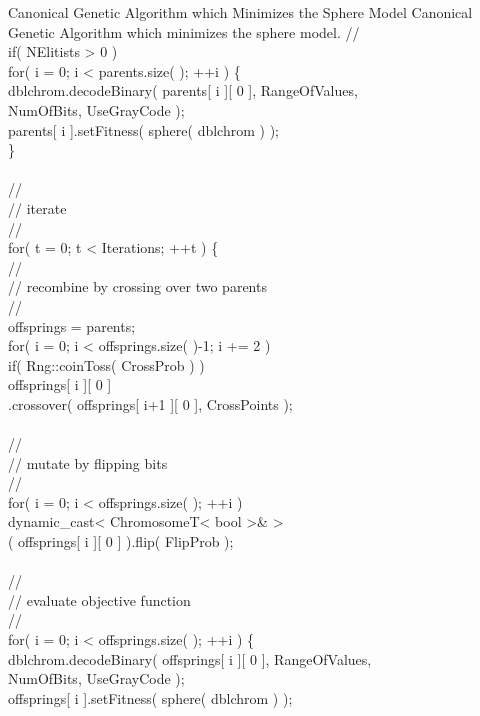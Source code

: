 \begin{programlisting}{Canonical Genetic Algorithm which Minimizes the Sphere Model}{
    Canonical Genetic Algorithm which minimizes the sphere model.}
    //\\
    if( NElitists > 0 )\\
        for( i = 0; i < parents.size( ); ++i ) \{\\
            dblchrom.decodeBinary( parents[ i ][ 0 ], RangeOfValues,\\
                                   NumOfBits, UseGrayCode );\\
            parents[ i ].setFitness( sphere( dblchrom ) );\\
        \}\\
\\
    //\\
    // iterate\\
    //\\
    for( t = 0; t < Iterations; ++t ) \{\\
        //\\
        // recombine by crossing over two parents\\
        //\\
        offsprings = parents;\\
        for( i = 0; i < offsprings.size( )-1; i += 2 )\\
            if( Rng::coinToss( CrossProb ) )\\
                offsprings[ i ][ 0 ]\\
                  .crossover( offsprings[ i+1 ][ 0 ], CrossPoints );\\
\\
        //\\
        // mutate by flipping bits\\
        //\\
        for( i = 0; i < offsprings.size( ); ++i )\\
            dynamic_cast< ChromosomeT< bool >& >\\
                ( offsprings[ i ][ 0 ] ).flip( FlipProb );\\
\\
        //\\
        // evaluate objective function\\
        //\\
        for( i = 0; i < offsprings.size( ); ++i ) \{\\
            dblchrom.decodeBinary( offsprings[ i ][ 0 ], RangeOfValues,\\
                                   NumOfBits, UseGrayCode );\\
            offsprings[ i ].setFitness( sphere( dblchrom ) );\\

\end{programlisting}
